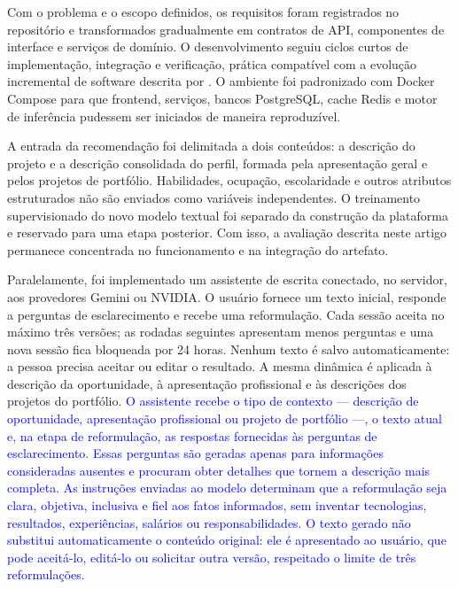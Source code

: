 \documentclass[12pt]{article}
\begin{document}
Com o problema e o escopo definidos, os requisitos foram registrados no repositório e transformados gradualmente em contratos de API, componentes de interface e serviços de domínio. O desenvolvimento seguiu ciclos curtos de implementação, integração e verificação, prática compatível com a evolução incremental de software descrita por \cite{pressman2021engenharia}. O ambiente foi padronizado com Docker Compose para que frontend, serviços, bancos PostgreSQL, cache Redis e motor de inferência pudessem ser iniciados de maneira reproduzível.

A entrada da recomendação foi delimitada a dois conteúdos: a descrição do projeto e a descrição consolidada do perfil, formada pela apresentação geral e pelos projetos de portfólio. Habilidades, ocupação, escolaridade e outros atributos estruturados não são enviados como variáveis independentes. O treinamento supervisionado do novo modelo textual foi separado da construção da plataforma e reservado para uma etapa posterior. Com isso, a avaliação descrita neste artigo permanece concentrada no funcionamento e na integração do artefato.

Paralelamente, foi implementado um assistente de escrita conectado, no servidor, aos provedores Gemini ou NVIDIA. O usuário fornece um texto inicial, responde a perguntas de esclarecimento e recebe uma reformulação. Cada sessão aceita no máximo três versões; as rodadas seguintes apresentam menos perguntas e uma nova sessão fica bloqueada por 24 horas. Nenhum texto é salvo automaticamente: a pessoa precisa aceitar ou editar o resultado. A mesma dinâmica é aplicada à descrição da oportunidade, à apresentação profissional e às descrições dos projetos do portfólio. \textcolor{blue}{O assistente recebe o tipo de contexto --- descrição de oportunidade, apresentação profissional ou projeto de portfólio ---, o texto atual e, na etapa de reformulação, as respostas fornecidas às perguntas de esclarecimento. Essas perguntas são geradas apenas para informações consideradas ausentes e procuram obter detalhes que tornem a descrição mais completa. As instruções enviadas ao modelo determinam que a reformulação seja clara, objetiva, inclusiva e fiel aos fatos informados, sem inventar tecnologias, resultados, experiências, salários ou responsabilidades. O texto gerado não substitui automaticamente o conteúdo original: ele é apresentado ao usuário, que pode aceitá-lo, editá-lo ou solicitar outra versão, respeitado o limite de três reformulações.}
\end{document}
